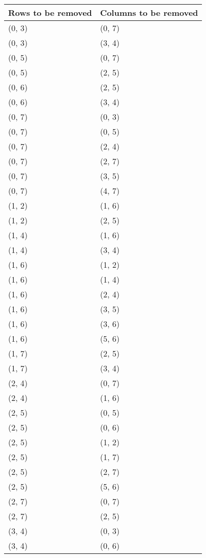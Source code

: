\begin{footnotesize}
\begin{longtable}[c]{|l|l|}
\hline
\textbf{Rows to be removed} & \textbf{Columns to be removed} \\ \hline
\endhead
(0, 3)
&(0, 7)
\\ \hline
(0, 3)
&(3, 4)
\\ \hline
(0, 5)
&(0, 7)
\\ \hline
(0, 5)
&(2, 5)
\\ \hline
(0, 6)
&(2, 5)
\\ \hline
(0, 6)
&(3, 4)
\\ \hline
(0, 7)
&(0, 3)
\\ \hline
(0, 7)
&(0, 5)
\\ \hline
(0, 7)
&(2, 4)
\\ \hline
(0, 7)
&(2, 7)
\\ \hline
(0, 7)
&(3, 5)
\\ \hline
(0, 7)
&(4, 7)
\\ \hline
(1, 2)
&(1, 6)
\\ \hline
(1, 2)
&(2, 5)
\\ \hline
(1, 4)
&(1, 6)
\\ \hline
(1, 4)
&(3, 4)
\\ \hline
(1, 6)
&(1, 2)
\\ \hline
(1, 6)
&(1, 4)
\\ \hline
(1, 6)
&(2, 4)
\\ \hline
(1, 6)
&(3, 5)
\\ \hline
(1, 6)
&(3, 6)
\\ \hline
(1, 6)
&(5, 6)
\\ \hline
(1, 7)
&(2, 5)
\\ \hline
(1, 7)
&(3, 4)
\\ \hline
(2, 4)
&(0, 7)
\\ \hline
(2, 4)
&(1, 6)
\\ \hline
(2, 5)
&(0, 5)
\\ \hline
(2, 5)
&(0, 6)
\\ \hline
(2, 5)
&(1, 2)
\\ \hline
(2, 5)
&(1, 7)
\\ \hline
(2, 5)
&(2, 7)
\\ \hline
(2, 5)
&(5, 6)
\\ \hline
(2, 7)
&(0, 7)
\\ \hline
(2, 7)
&(2, 5)
\\ \hline
(3, 4)
&(0, 3)
\\ \hline
(3, 4)
&(0, 6)
\\ \hline

\end{longtable}
\end{footnotesize}
